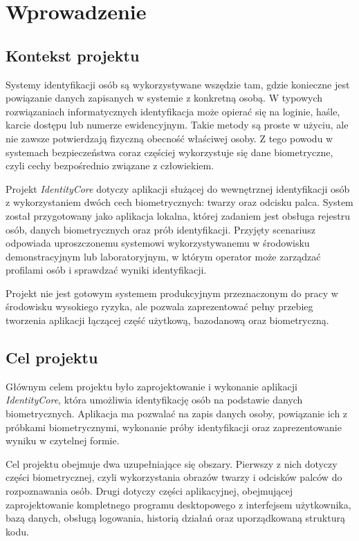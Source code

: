 \chapter{Wprowadzenie}
\label{chap:wprowadzenie}

\section{Kontekst projektu}

Systemy identyfikacji osób są wykorzystywane wszędzie tam, gdzie konieczne jest powiązanie danych zapisanych w systemie z konkretną osobą. W typowych rozwiązaniach informatycznych identyfikacja może opierać się na loginie, haśle, karcie dostępu lub numerze ewidencyjnym. Takie metody są proste w użyciu, ale nie zawsze potwierdzają fizyczną obecność właściwej osoby. Z tego powodu w systemach bezpieczeństwa coraz częściej wykorzystuje się dane biometryczne, czyli cechy bezpośrednio związane z człowiekiem.

Projekt \textit{IdentityCore} dotyczy aplikacji służącej do wewnętrznej identyfikacji osób z wykorzystaniem dwóch cech biometrycznych: twarzy oraz odcisku palca. System został przygotowany jako aplikacja lokalna, której zadaniem jest obsługa rejestru osób, danych biometrycznych oraz prób identyfikacji. Przyjęty scenariusz odpowiada uproszczonemu systemowi wykorzystywanemu w środowisku demonstracyjnym lub laboratoryjnym, w którym operator może zarządzać profilami osób i sprawdzać wyniki identyfikacji.

Projekt nie jest gotowym systemem produkcyjnym przeznaczonym do pracy w środowisku wysokiego ryzyka, ale pozwala zaprezentować pełny przebieg tworzenia aplikacji łączącej część użytkową, bazodanową oraz biometryczną.

\section{Cel projektu}

Głównym celem projektu było zaprojektowanie i wykonanie aplikacji \textit{IdentityCore}, która umożliwia identyfikację osób na podstawie danych biometrycznych. Aplikacja ma pozwalać na zapis danych osoby, powiązanie ich z próbkami biometrycznymi, wykonanie próby identyfikacji oraz zaprezentowanie wyniku w czytelnej formie.

Cel projektu obejmuje dwa uzupełniające się obszary. Pierwszy z nich dotyczy części biometrycznej, czyli wykorzystania obrazów twarzy i odcisków palców do rozpoznawania osób. Drugi dotyczy części aplikacyjnej, obejmującej zaprojektowanie kompletnego programu desktopowego z interfejsem użytkownika, bazą danych, obsługą logowania, historią działań oraz uporządkowaną strukturą kodu.

